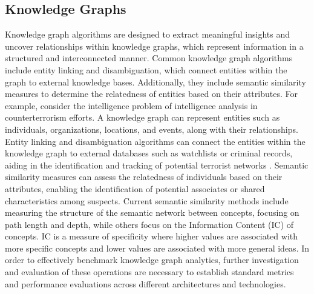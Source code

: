 \documentclass[letterpaper, 10pt]{article}
\begin{document}
\begin{multicols}{2}
{        \subsection{Knowledge Graphs}\label{section:knowledgeGraphs}
            Knowledge graph algorithms are designed to extract meaningful insights and uncover relationships within knowledge graphs, which represent information in a structured and interconnected manner.
            Common knowledge graph algorithms include entity linking and disambiguation, which connect entities within the graph to external knowledge bases. 
            Additionally, they include semantic similarity measures to determine the relatedness of entities based on their attributes.
            For example, consider the intelligence problem of intelligence analysis in counterterrorism efforts. 
            A knowledge graph can represent entities such as individuals, organizations, locations, and events, along with their relationships. 
            Entity linking and disambiguation algorithms can connect the entities within the knowledge graph to external databases such as watchlists or criminal records, aiding in the identification and tracking of potential terrorist networks \cite{Xia2019}. 
            Semantic similarity measures can assess the relatedness of individuals based on their attributes, enabling the identification of potential associates or shared characteristics among suspects. Current semantic similarity methods include  measuring the structure of the semantic network between concepts, focusing on path length and depth, while others focus on the Information Content (IC) of concepts. IC is a measure of specificity where higher values are associated with more specific concepts and lower values are associated with more general ideas. 
            In order to effectively benchmark knowledge graph analytics, further investigation and evaluation of these operations are necessary to establish standard metrics and performance evaluations across different architectures and technologies.
            
}
\end{multicols}
\end{document}
